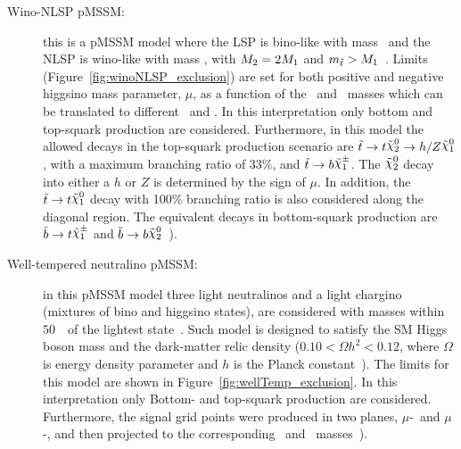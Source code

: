 \begin{description}
				\item[\boldmath Wino-NLSP pMSSM:] this is a \ac{pMSSM} model where the \ac{LSP} is bino-like with mass \mone\ and the \ac{NLSP} is wino-like with mass \mtwo, with $M_{2}=2M_{1}$ and $m_{\tilde{t}}>M_{1}$~\cite{Papucci2011}. Limits (Figure~\ref{fig:winoNLSP_exclusion}) are set for both positive and negative higgsino mass parameter, $\mu$, as a function of the \stop\ and \ninoone\ masses which can be translated to different \mone\ and \mqlthree. In this interpretation only bottom and top-squark production are considered. Furthermore, in this model the allowed decays in the top-squark production scenario are $\stop\to t \ninotwo\to h/Z \LSP$, with a maximum branching ratio of 33\%, and $\stop \to b \chinoonepm$. The $\ninotwo$ decay into either a $h$ or $Z$ is determined by the sign of $\mu$. In addition, the $\stop\to t\LSP$ decay with 100\% branching ratio is also considered along the diagonal region. The equivalent decays in bottom-squark production are $\sbottom\to t\chinoonepm$ and $\sbottom\to b\ninotwo$~\cite{stop0L}). %

				\item[\boldmath Well-tempered neutralino pMSSM:] in this \ac{pMSSM} model three light neutralinos and a light chargino (mixtures of bino and higgsino states), are considered with masses within $50$~\GeV\ of the lightest state~\cite{atlasDM,wellTemp}. Such model is designed to satisfy the \ac{SM} Higgs boson mass and the dark-matter relic density ($0.10<\Omega h^{2}<0.12$, where $\Omega$ is energy density parameter and $h$ is the Planck constant~\cite{relic_density}).
				The limits for this model are shown in Figure~\ref{fig:wellTemp_exclusion}. In this interpretation only Bottom- and top-squark production are considered. Furthermore, the signal grid points were produced in two planes, $\mu$-\mtr\ and $\mu$-\mqlthree, and then projected to the corresponding \stop\ and \ninoone\ masses~\cite{stop0L}).%
			\end{description}

